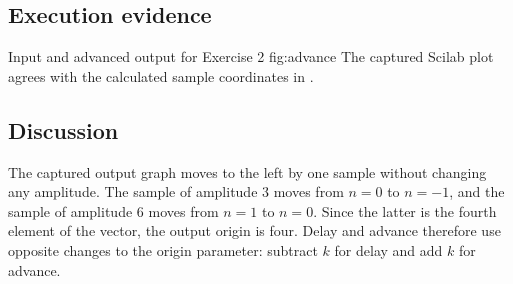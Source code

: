 \subsection{Execution evidence}
  {Input and advanced output for Exercise 2}
  {fig:advance}
The captured Scilab plot agrees with the calculated sample coordinates
in .

\subsection{Discussion}
The captured output graph moves to the left by one sample without changing any
amplitude. The sample of amplitude $3$ moves from $n=0$ to $n=-1$, and
the sample of amplitude $6$ moves from $n=1$ to $n=0$. Since the latter
is the fourth element of the vector, the output origin is four.
Delay and advance therefore use opposite changes to the origin parameter:
subtract $k$ for delay and add $k$ for advance.
